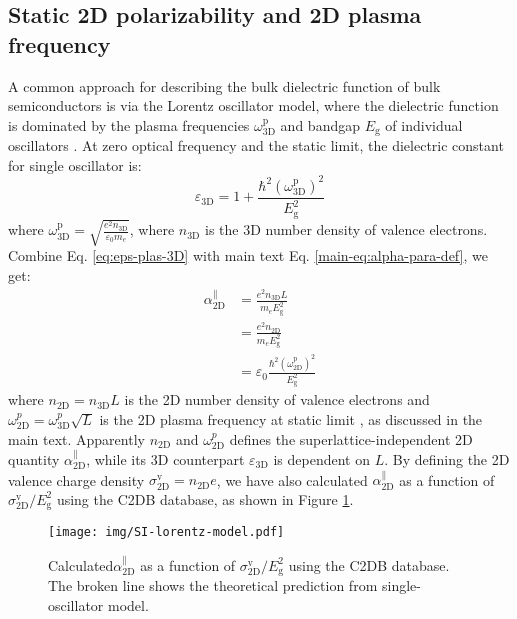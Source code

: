 \documentclass[manuscript=suppinfo,email=true,hyperref=true,keywords=false]{achemso}
\begin{document}
\subsection{Static 2D polarizability and 2D plasma frequency}
\label{ssec:omega-p}

A common approach for describing the bulk dielectric function of bulk
semiconductors is via the Lorentz oscillator model, where the
dielectric function is dominated by the plasma frequencies
$\omega_{\mathrm{3D}}^{\mathrm{p}}$ and bandgap $E_{\mathrm{g}}$ of
individual oscillators \cite{ketterson_physics_2016}. At zero optical
frequency and the static limit, the dielectric constant for single
oscillator is:
\begin{equation}
  \label{eq:eps-plas-3D}
  \varepsilon_{\mathrm{3D}} = 1 +
  \frac{\hbar^{2} (\omega_{\mathrm{3D}}^{\mathrm{p}})^{2}}{E_{\mathrm{g}}^{2}}
\end{equation}
where
$\omega_{\mathrm{3D}}^{\mathrm{p}} = {\displaystyle \sqrt{\frac{e^{2}
      n_{\mathrm{3D}}}{\varepsilon_{0} m_{e}}}}$, where
$n_{\mathrm{3D}}$ is the 3D number density of valence
electrons. Combine Eq. \ref{eq:eps-plas-3D} with main text
Eq. \ref{main-eq:alpha-para-def}, we get:
\begin{equation}
  \begin{aligned}
  \label{eq:alpha-plas}
  \alpha_{\mathrm{2D}}^{\parallel} &= \frac{e^{2} n_{\mathrm{3D}} L}{m_{e} E_{\mathrm{g}}^{2}} \\
  &= \frac{e^{2} n_{\mathrm{2D}}}{m_{e} E_{\mathrm{g}}^{2}} \\
  &= \varepsilon_{0} \frac{\hbar^{2}
    (\omega_{\mathrm{2D}}^{\mathrm{p}})^{2}}{E_{\mathrm{g}}^{2}}
\end{aligned}
\end{equation}
where $n_{\mathrm{2D}} =n_{\mathrm{3D}} L$ is the 2D number density of
valence electrons and
$\omega_{\mathrm{2D}}^{p}=\omega_{\mathrm{3D}}^{p}\sqrt{L}$ is the 2D
plasma frequency at static limit \cite{Nazarov_2015_2D_3D}, as
discussed in the main text. Apparently $n_{\mathrm{2D}}$ and
$\omega_{\mathrm{2D}}^{p}$ defines the superlattice-independent 2D
quantity $\alpha_{\mathrm{2D}}^{\parallel}$, while its 3D counterpart
$\varepsilon_{\mathrm{3D}}$ is dependent on $L$. By defining the 2D
valence charge density
$\sigma_{\mathrm{2D}}^{\mathrm{v}}=n_{\mathrm{2D}}e$, we have also
calculated $\alpha_{\mathrm{2D}}^{\parallel}$ as a function of
$\sigma_{\mathrm{2D}}^{\mathrm{v}}/E_{\mathrm{g}}^{2}$ using the C2DB database, as shown in Figure \ref{fig:plasma}.
\begin{figure}[htbp]
  \centering
  \texttt{[image: img/SI-lorentz-model.pdf]}
  \caption{Calculated$\alpha_{\mathrm{2D}}^{\parallel}$ as a function of
    $\sigma_{\mathrm{2D}}^{\mathrm{v}}/E_{\mathrm{g}}^{2}$ using the
    C2DB database. The broken line shows the theoretical prediction
    from single-oscillator model.}
  \label{fig:plasma}
\end{figure}
\end{document}
